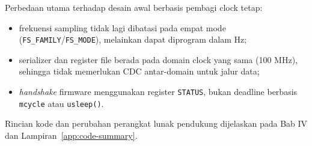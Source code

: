 Perbedaan utama terhadap desain awal berbasis pembagi clock tetap:
\begin{itemize}
    \item frekuensi sampling tidak lagi dibatasi pada empat mode (\texttt{FS\_FAMILY}/\texttt{FS\_MODE}), melainkan dapat diprogram dalam Hz;
    \item serializer dan register file berada pada domain clock yang sama (100 MHz), sehingga tidak memerlukan CDC antar-domain untuk jalur data;
    \item \textit{handshake} firmware menggunakan register \texttt{STATUS}, bukan deadline berbasis \texttt{mcycle} atau \texttt{usleep()}.
\end{itemize}

Rincian kode dan perubahan perangkat lunak pendukung dijelaskan pada Bab IV dan Lampiran~\ref{app:code-summary}.
